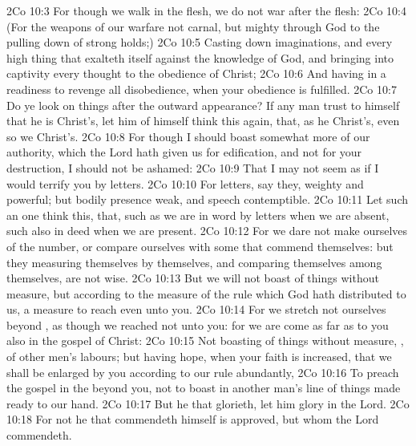 \vs 2Co 10:3 For though we walk in the flesh, we do not war after the flesh:
\vs 2Co 10:4 (For the weapons of our warfare  not carnal, but mighty through God to the pulling down of strong holds;)
\vs 2Co 10:5 Casting down imaginations, and every high thing that exalteth itself against the knowledge of God, and bringing into captivity every thought to the obedience of Christ;
\vs 2Co 10:6 And having in a readiness to revenge all disobedience, when your obedience is fulfilled.
\vs 2Co 10:7 Do ye look on things after the outward appearance? If any man trust to himself that he is Christ's, let him of himself think this again, that, as he  Christ's, even so  we Christ's.
\vs 2Co 10:8 For though I should boast somewhat more of our authority, which the Lord hath given us for edification, and not for your destruction, I should not be ashamed:
\vs 2Co 10:9 That I may not seem as if I would terrify you by letters.
\vs 2Co 10:10 For  letters, say they,  weighty and powerful; but  bodily presence  weak, and  speech contemptible.
\vs 2Co 10:11 Let such an one think this, that, such as we are in word by letters when we are absent, such  also in deed when we are present.
\vs 2Co 10:12 For we dare not make ourselves of the number, or compare ourselves with some that commend themselves: but they measuring themselves by themselves, and comparing themselves among themselves, are not wise.
\vs 2Co 10:13 But we will not boast of things without  measure, but according to the measure of the rule which God hath distributed to us, a measure to reach even unto you.
\vs 2Co 10:14 For we stretch not ourselves beyond , as though we reached not unto you: for we are come as far as to you also in  the gospel of Christ:
\vs 2Co 10:15 Not boasting of things without  measure, , of other men's labours; but having hope, when your faith is increased, that we shall be enlarged by you according to our rule abundantly,
\vs 2Co 10:16 To preach the gospel in the  beyond you,  not to boast in another man's line of things made ready to our hand.
\vs 2Co 10:17 But he that glorieth, let him glory in the Lord.
\vs 2Co 10:18 For not he that commendeth himself is approved, but whom the Lord commendeth.
